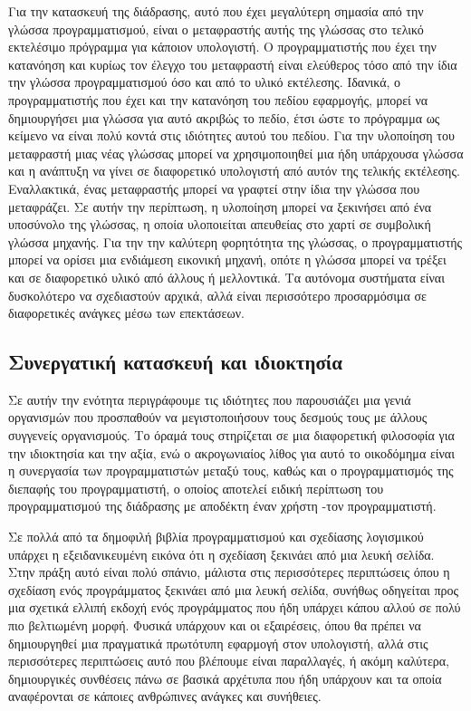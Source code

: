 \documentclass[
]{article}
\begin{document}
Για την κατασκευή της διάδρασης, αυτό που έχει μεγαλύτερη σημασία από
την γλώσσα προγραμματισμού, είναι ο μεταφραστής αυτής της γλώσσας στο
τελικό εκτελέσιμο πρόγραμμα για κάποιον υπολογιστή. Ο προγραμματιστής
που έχει την κατανόηση και κυρίως τον έλεγχο του μεταφραστή είναι
ελεύθερος τόσο από την ίδια την γλώσσα προγραμματισμού όσο και από το
υλικό εκτέλεσης. Ιδανικά, ο προγραμματιστής που έχει και την κατανόηση
του πεδίου εφαρμογής, μπορεί να δημιουργήσει μια γλώσσα για αυτό ακριβώς
το πεδίο, έτσι ώστε το πρόγραμμα ως κείμενο να είναι πολύ κοντά στις
ιδιότητες αυτού του πεδίου. Για την υλοποίηση του μεταφραστή μιας νέας
γλώσσας μπορεί να χρησιμοποιηθεί μια ήδη υπάρχουσα γλώσσα και η ανάπτυξη
να γίνει σε διαφορετικό υπολογιστή από αυτόν της τελικής εκτέλεσης.
Εναλλακτικά, ένας μεταφραστής μπορεί να γραφτεί στην ίδια την γλώσσα που
μεταφράζει. Σε αυτήν την περίπτωση, η υλοποίηση μπορεί να ξεκινήσει από
ένα υποσύνολο της γλώσσας, η οποία υλοποιείται απευθείας στο χαρτί σε
συμβολική γλώσσα μηχανής. Για την την καλύτερη φορητότητα της γλώσσας, ο
προγραμματιστής μπορεί να ορίσει μια ενδιάμεση εικονική μηχανή, οπότε η
γλώσσα μπορεί να τρέξει και σε διαφορετικό υλικό από άλλους ή
μελλοντικά. Τα αυτόνομα συστήματα είναι δυσκολότερο να σχεδιαστούν
αρχικά, αλλά είναι περισσότερο προσαρμόσιμα σε διαφορετικές ανάγκες μέσω
των επεκτάσεων.

\hypertarget{ux3c3ux3c5ux3bdux3b5ux3c1ux3b3ux3b1ux3c4ux3b9ux3baux3ae-ux3baux3b1ux3c4ux3b1ux3c3ux3baux3b5ux3c5ux3ae-ux3baux3b1ux3b9-ux3b9ux3b4ux3b9ux3bfux3baux3c4ux3b7ux3c3ux3afux3b1}{%
\subsection{Συνεργατική κατασκευή και
ιδιοκτησία}\label{ux3c3ux3c5ux3bdux3b5ux3c1ux3b3ux3b1ux3c4ux3b9ux3baux3ae-ux3baux3b1ux3c4ux3b1ux3c3ux3baux3b5ux3c5ux3ae-ux3baux3b1ux3b9-ux3b9ux3b4ux3b9ux3bfux3baux3c4ux3b7ux3c3ux3afux3b1}}

Σε αυτήν την ενότητα περιγράφουμε τις ιδιότητες που παρουσιάζει μια
γενιά οργανισμών που προσπαθούν να μεγιστοποιήσουν τους δεσμούς τους με
άλλους συγγενείς οργανισμούς. Το όραμά τους στηρίζεται σε μια
διαφορετική φιλοσοφία για την ιδιοκτησία και την αξία, ενώ ο
ακρογωνιαίος λίθος για αυτό το οικοδόμημα είναι η συνεργασία των
προγραμματιστών μεταξύ τους, καθώς και ο προγραμματισμός της διεπαφής
του προγραμματιστή, ο οποίος αποτελεί ειδική περίπτωση του
προγραμματισμού της διάδρασης με αποδέκτη έναν χρήστη -τον
προγραμματιστή.

Σε πολλά από τα δημοφιλή βιβλία προγραμματισμού και σχεδίασης λογισμικού
υπάρχει η εξειδανικευμένη εικόνα ότι η σχεδίαση ξεκινάει από μια λευκή
σελίδα. Στην πράξη αυτό είναι πολύ σπάνιο, μάλιστα στις περισσότερες
περιπτώσεις όπου η σχεδίαση ενός προγράμματος ξεκινάει από μια λευκή
σελίδα, συνήθως οδηγείται προς μια σχετικά ελλιπή εκδοχή ενός
προγράμματος που ήδη υπάρχει κάπου αλλού σε πολύ πιο βελτιωμένη μορφή.
Φυσικά υπάρχουν και οι εξαιρέσεις, όπου θα πρέπει να δημιουργηθεί μια
πραγματικά πρωτότυπη εφαρμογή στον υπολογιστή, αλλά στις περισσότερες
περιπτώσεις αυτό που βλέπουμε είναι παραλλαγές, ή ακόμη καλύτερα,
δημιουργικές συνθέσεις πάνω σε βασικά αρχέτυπα που ήδη υπάρχουν και τα
οποία αναφέρονται σε κάποιες ανθρώπινες ανάγκες και συνήθειες.
\end{document}
